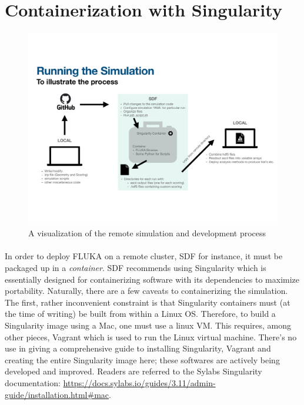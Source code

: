 
\section{Containerization with Singularity}

\begin{figure}[h]
    \begin{center}
    \includegraphics[scale=0.5]{figures/sim_diagram.pdf}
    \caption{A visualization of the remote simulation and development process}
    \label{fig:process1}
    \end{center}
\end{figure}

\paragraph{}
In order to deploy FLUKA on a remote cluster, SDF for instance, it must be packaged up in a \textit{container}. SDF recommends using Singularity which is essentially designed for containerizing software with its dependencies to maximize portability. Naturally, there are a few caveats to containerizing the simulation. The first, rather inconvenient constraint is that Singularity containers must (at the time of writing) be built from within a Linux OS. Therefore, to build a Singularity image using a Mac, one must use a linux VM. This requires, among other pieces, Vagrant which is used to run the Linux virtual machine. There's no use in giving a comprehensive guide to installing Singularity, Vagrant and creating the entire Singularity image here; these softwares are actively being developed and improved. Readers are referred to the Sylabs Singularity documentation: \url{https://docs.sylabs.io/guides/3.11/admin-guide/installation.html#mac}.

